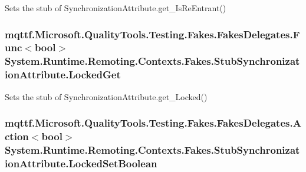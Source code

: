 Sets the stub of Synchronization\-Attribute.\-get\-\_\-\-Is\-Re\-Entrant()

\hypertarget{class_system_1_1_runtime_1_1_remoting_1_1_contexts_1_1_fakes_1_1_stub_synchronization_attribute_abd915578947cdb85311c8215680a7ffb}{
\subsubsection[{Locked\-Get}]{\setlength{\rightskip}{0pt plus 5cm}mqttf.\-Microsoft.\-Quality\-Tools.\-Testing.\-Fakes.\-Fakes\-Delegates.\-Func$<$bool$>$ System.\-Runtime.\-Remoting.\-Contexts.\-Fakes.\-Stub\-Synchronization\-Attribute.\-Locked\-Get}}\label{class_system_1_1_runtime_1_1_remoting_1_1_contexts_1_1_fakes_1_1_stub_synchronization_attribute_abd915578947cdb85311c8215680a7ffb}


Sets the stub of Synchronization\-Attribute.\-get\-\_\-\-Locked()

\hypertarget{class_system_1_1_runtime_1_1_remoting_1_1_contexts_1_1_fakes_1_1_stub_synchronization_attribute_ad884426f163afa8de6627a9c00c5677f}{
\subsubsection[{Locked\-Set\-Boolean}]{\setlength{\rightskip}{0pt plus 5cm}mqttf.\-Microsoft.\-Quality\-Tools.\-Testing.\-Fakes.\-Fakes\-Delegates.\-Action$<$bool$>$ System.\-Runtime.\-Remoting.\-Contexts.\-Fakes.\-Stub\-Synchronization\-Attribute.\-Locked\-Set\-Boolean}}\label{class_system_1_1_runtime_1_1_remoting_1_1_contexts_1_1_fakes_1_1_stub_synchronization_attribute_ad884426f163afa8de6627a9c00c5677f}


